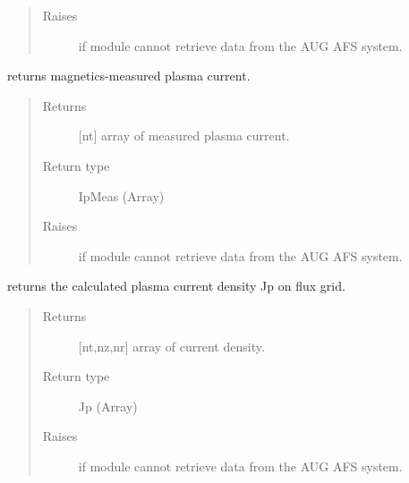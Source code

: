 \documentclass[letterpaper,10pt,english]{sphinxmanual}
\begin{document}
\begin{fulllineitems}
\begin{fulllineitems}
\begin{quote}
\begin{description}
\item[{Raises}] \leavevmode
{} \textendash{} if module cannot retrieve data from the AUG AFS system.

\end{description}\end{quote}

\end{fulllineitems}


\begin{fulllineitems}
\label{\detokenize{eqtools:eqtools.AUGData.AUGDDData.getIpMeas}}
returns magnetics-measured plasma current.
\begin{quote}\begin{description}
\item[{Returns}] \leavevmode
{[}nt{]} array of measured plasma current.

\item[{Return type}] \leavevmode
IpMeas (Array)

\item[{Raises}] \leavevmode
{} \textendash{} if module cannot retrieve data from the AUG AFS system.

\end{description}\end{quote}

\end{fulllineitems}


\begin{fulllineitems}
\label{\detokenize{eqtools:eqtools.AUGData.AUGDDData.getJp}}
returns the calculated plasma current density Jp on flux grid.
\begin{quote}\begin{description}
\item[{Returns}] \leavevmode
{[}nt,nz,nr{]} array of current density.

\item[{Return type}] \leavevmode
Jp (Array)

\item[{Raises}] \leavevmode
{} \textendash{} if module cannot retrieve data from the AUG AFS system.


\end{description}
\end{quote}
\end{fulllineitems}
\end{fulllineitems}
\end{document}
